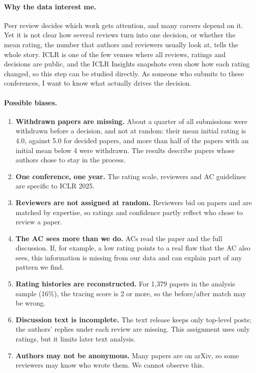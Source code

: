 \documentclass[11pt]{article}
\begin{document}
\paragraph{Why the data interest me.} Peer review decides which work gets attention, and many careers depend on it. Yet it is not clear how several reviews turn into one decision, or whether the mean rating, the number that authors and reviewers usually look at, tells the whole story. ICLR is one of the few venues where all reviews, ratings and decisions are public, and the ICLR Insights snapshots even show how each rating changed, so this step can be studied directly. As someone who submits to these conferences, I want to know what actually drives the decision.

\paragraph{Possible biases.}
\begin{enumerate}
\item \textbf{Withdrawn papers are missing.} About a quarter of all submissions were withdrawn before a decision, and not at random: their mean initial rating is 4.0, against 5.0 for decided papers, and more than half of the papers with an initial mean below 4 were withdrawn. The results describe papers whose authors chose to stay in the process.
\item \textbf{One conference, one year.} The rating scale, reviewers and AC guidelines are specific to ICLR 2025.
\item \textbf{Reviewers are not assigned at random.} Reviewers bid on papers and are matched by expertise, so ratings and confidence partly reflect who chose to review a paper.
\item \textbf{The AC sees more than we do.} ACs read the paper and the full discussion. If, for example, a low rating points to a real flaw that the AC also sees, this information is missing from our data and can explain part of any pattern we find.
\item \textbf{Rating histories are reconstructed.} For 1,379 papers in the analysis sample (16\%), the tracing score is 2 or more, so the before/after match may be wrong.
\item \textbf{Discussion text is incomplete.} The text release keeps only top-level posts; the authors' replies under each review are missing. This assignment uses only ratings, but it limits later text analysis.
\item \textbf{Authors may not be anonymous.} Many papers are on arXiv, so some reviewers may know who wrote them. We cannot observe this.
\end{enumerate}
\end{document}
